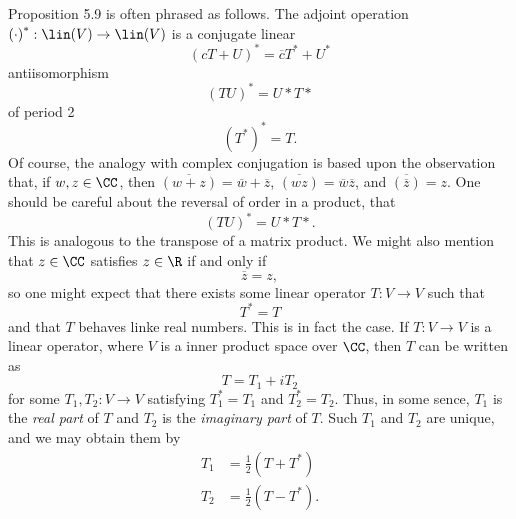 \documentclass[linearalgebraII]{subfiles}
\begin{document}
    \begin{remark}
        Proposition 5.9 is often phrased as follows. The adjoint operation $\left( \cdot \right) ^*:\lin(V)\to\lin(V)$ is a conjugate linear
        \begin{equation*}
            \left( cT+U \right) ^* = \overline{c} T^* + U^*
        \end{equation*}
        antiisomorphism
        \begin{equation*}
            \left( TU \right) ^* = U*T*
        \end{equation*}
        of period 2
        \begin{equation*}
            \left( T^* \right) ^* = T.
        \end{equation*}
        Of course, the analogy with complex conjugation is based upon the observation that, if $w,z\in\CC$, then $\overline{\left( w+z \right) } = \overline{w} + \overline{z}$, $\overline{\left( wz \right) } =  \overline{w} \overline{z}$, and $\overline{\left( \overline{z}  \right) } = z$. One should be careful about the reversal of order in a product, that
        \begin{equation*}
            \left( TU \right) ^* = U*T*.
        \end{equation*}
        This is analogous to the transpose of a matrix product. We might also mention that $z\in\CC$ satisfies $z\in\R$ if and only if
        \begin{equation*}
            \overline{z} = z,
        \end{equation*}
        so one might expect that there exists some linear operator $T:V\to V$ such that
        \begin{equation*}
            T^* = T
        \end{equation*}
        and that $T$ behaves linke real numbers. This is in fact the case. If $T:V\to V$ is a linear operator, where $V$ is a inner product space over $\CC$, then $T$ can be written as
        \begin{equation*}
            T = T_1 + iT_2
        \end{equation*}
        for some $T_1, T_2:V\to V$ satisfying $T_1^* = T_1$ and $T_2^* = T_2$. Thus, in some sence, $T_1$ is the \textit{real part} of $T$ and $T_2$ is the \textit{imaginary part} of $T$. Such $T_1$ and $T_2$ are unique, and we may obtain them by
        \begin{align*}
            T_1 & = \frac{1}{2}\left( T+T^* \right) \\
            T_2 & = \frac{1}{2}\left( T-T^* \right) .
        \end{align*} 
    \end{remark}
\end{document}
